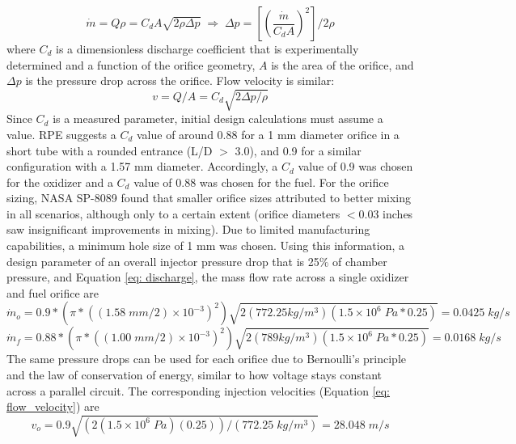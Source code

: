 \documentclass[9pt]{article} %
\numberwithin{equation}{section} %
\begin{document}
\begin{equation} \label{eq: discharge}
    \dot{m} = Q \rho = C_{d} A \sqrt{2 \rho \Delta p} \; \Longrightarrow \;
    \Delta p = \left[ \left( \frac{\dot{m}}{C_{d} A} \right)^{2} \right] / 2 \rho
\end{equation}
where $C_{d}$ is a dimensionless discharge coefficient that is experimentally determined and a function of the orifice geometry, $A$ is the area of the orifice, and $\Delta p$ is the pressure drop across the orifice. Flow velocity is similar:
\begin{equation} \label{eq: flow_velocity}
    v = Q/A = C_{d} \sqrt{2 \Delta p /\rho}
\end{equation}
Since $C_{d}$ is a measured parameter, initial design calculations must assume a value. RPE suggests a $C_{d}$ value of around 0.88 for a 1 mm diameter orifice in a short tube with a rounded entrance (L/D $>$ 3.0), and 0.9 for a similar configuration with a 1.57 mm diameter. Accordingly, a $C_{d}$ value of 0.9 was chosen for the oxidizer and a $C_{d}$ value of 0.88 was chosen for the fuel. For the orifice sizing, NASA SP-8089 found that smaller orifice sizes attributed to better mixing in all scenarios, although only to a certain extent (orifice diameters $<$0.03 inches saw insignificant improvements in mixing). Due to limited manufacturing capabilities, a minimum hole size of 1 mm was chosen. Using this information, a design parameter of an overall injector pressure drop that is 25$\%$ of chamber pressure, and Equation \ref{eq: discharge}, the mass flow rate across a single oxidizer and fuel orifice are
\begin{equation*}
    \dot{m}_{o} = 0.9*(\pi*((1.58 \; mm/2)\times 10^{-3})^{2}) \sqrt{2(772.25 kg/m^{3})(1.5 \times 10^{6} \; Pa * 0.25)} = 0.0425 \; kg/s
\end{equation*}
\begin{equation*}
    \dot{m}_{f} = 0.88*(\pi*((1.00 \; mm/2)\times 10^{-3})^{2}) \sqrt{2(789 kg/m^{3})(1.5 \times 10^{6} \; Pa * 0.25)} = 0.0168 \; kg/s
\end{equation*}
The same pressure drops can be used for each orifice due to Bernoulli's principle and the law of conservation of energy, similar to how voltage stays constant across a parallel circuit. The corresponding injection velocities (Equation \ref{eq: flow_velocity}) are
\begin{equation*}
    v_{o} = 0.9 \sqrt{(2(1.5\times 10^{6} \; Pa)(0.25))/(772.25 \; kg/m^{3})} = 28.048 \; m/s
\end{equation*}
\end{document}
